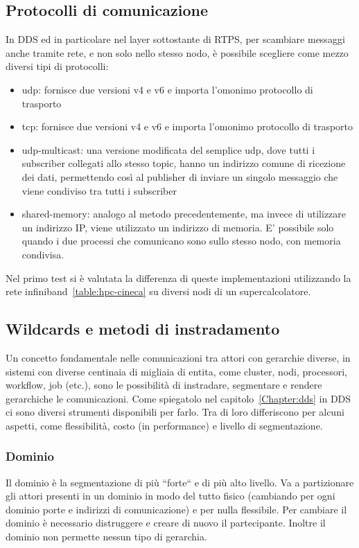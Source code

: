 \subsection{Protocolli di comunicazione}
In DDS ed in particolare nel layer sottostante di RTPS, per scambiare messaggi anche tramite rete, e non solo nello stesso nodo, è possibile scegliere come mezzo diversi tipi di protocolli:

\begin{itemize}
    \item udp: fornisce due versioni v4 e v6 e importa l'omonimo protocollo di trasporto
    \item tcp: fornisce due versioni v4 e v6 e importa l'omonimo protocollo di trasporto
    \item udp-multicast: una versione modificata del semplice udp, dove tutti i subscriber collegati allo stesso topic, hanno un indirizzo comune di ricezione dei dati, permettendo così al publisher di inviare un singolo messaggio che viene condiviso tra tutti i subscriber  %
    \item shared-memory: analogo al metodo precedentemente, ma invece di utilizzare un indirizzo IP, viene utilizzato un indirizzo di memoria. E' possibile solo quando i due processi che comunicano sono sullo stesso nodo, con memoria condivisa.
\end{itemize}

Nel primo test si è valutata la differenza di queste implementazioni utilizzando la rete infiniband~\ref{table:hpc-cineca} su diversi nodi di un supercalcolatore. 

\subsection{Wildcards e metodi di instradamento}
Un concetto fondamentale nelle comunicazioni tra attori con gerarchie diverse, in sistemi con diverse centinaia di migliaia di entita, come cluster, nodi, processori, workflow, job (etc.), sono le possibilità di instradare, segmentare e rendere gerarchiche le comunicazioni. Come spiegatolo nel capitolo~\ref{Chapter:dds} in DDS ci sono diversi strumenti disponibili per farlo. Tra di loro differiscono per alcuni aspetti, come flessibilità, costo (in performance) e livello di segmentazione.

\subsubsection{Dominio} 
Il dominio è la segmentazione di più ``forte`` e di più alto livello. Va a partizionare gli attori presenti in un dominio in modo del tutto fisico (cambiando per ogni dominio porte e indirizzi di comunicazione) e per nulla flessibile. Per cambiare il dominio è necessario distruggere e creare di nuovo il partecipante. Inoltre il dominio non permette nessun tipo di gerarchia.
    
